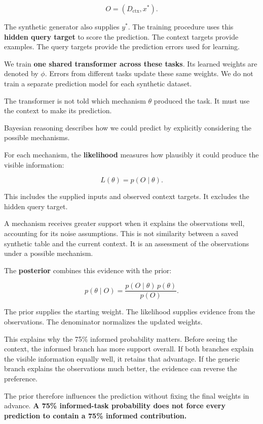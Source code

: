 \documentclass[11pt]{article}
\begin{document}
\[
O=(D_{\mathrm{ctx}},x^\ast).
\]

The synthetic generator also supplies \(y^\ast\). The training procedure uses this
\textbf{hidden query target} to score the prediction. The context targets provide
examples. The query targets provide the prediction errors used for learning.

We train \textbf{one shared transformer across these tasks}. Its learned weights are
denoted by \(\phi\). Errors from different tasks update these same weights. We do not
train a separate prediction model for each synthetic dataset.

The transformer is not told which mechanism \(\theta\) produced the task. It must use the
context to make its prediction.

Bayesian reasoning describes how we could predict by explicitly considering the possible
mechanisms.

For each mechanism, the \textbf{likelihood} measures how plausibly it could produce the
visible information:

\[
L(\theta)=p(O\mid\theta).
\]

This includes the supplied inputs and observed context targets. It excludes the hidden
query target.

A mechanism receives greater support when it explains the observations well, accounting
for its noise assumptions. This is not similarity between a saved synthetic table and the
current context. It is an assessment of the observations under a possible mechanism.

The \textbf{posterior} combines this evidence with the prior:

\[
p(\theta\mid O)
=
\frac{p(O\mid\theta)\,p(\theta)}{p(O)}.
\]

The prior supplies the starting weight. The likelihood supplies evidence from the
observations. The denominator normalizes the updated weights.

This explains why the 75\% informed probability matters. Before seeing the context, the
informed branch has more support overall. If both branches explain the visible information
equally well, it retains that advantage. If the generic branch explains the observations
much better, the evidence can reverse the preference.

The prior therefore influences the prediction without fixing the final weights in advance.
\textbf{A 75\% informed-task probability does not force every prediction to contain a 75\%
informed contribution.}
\end{document}
